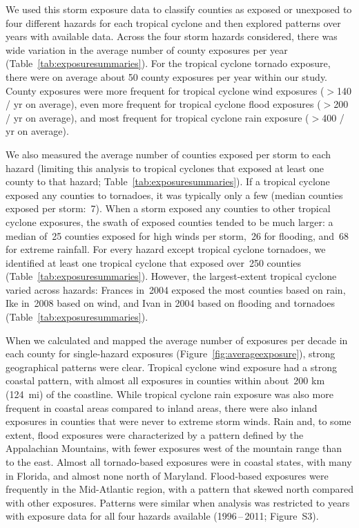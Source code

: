 We used this storm exposure data to classify counties as exposed or unexposed
to four different hazards for each tropical cyclone and then explored patterns
over years with available data. Across the four storm hazards considered, there
was wide variation in the average number of county exposures per year
(Table~\ref{tab:exposuresummaries}). For the tropical cyclone tornado exposure,
there were on average about 50 county exposures per year within our study.
County exposures were more frequent for tropical cyclone wind exposures ($>$140
/ yr on average), even more frequent for tropical cyclone flood exposures
($>$200 / yr on average), and most frequent for tropical cyclone rain exposure
($>$400 / yr on average). 

We also measured the average number of counties exposed per storm to each
hazard (limiting this analysis to tropical cyclones that exposed at least one
county to that hazard; Table~\ref{tab:exposuresummaries}).  If a tropical
cyclone exposed any counties to tornadoes, it was typically only a few (median
counties exposed per storm:~7). When a storm exposed any counties to other
tropical cyclone exposures, the swath of exposed counties tended to be much
larger: a median of~25 counties exposed for high winds per storm,~26 for
flooding, and~68 for extreme rainfall.  For every hazard except tropical
cyclone tornadoes, we identified at least one tropical cyclone that exposed
over~250 counties (Table~\ref{tab:exposuresummaries}).  However, the
largest-extent tropical cyclone varied across hazards: Frances in~2004 exposed
the most counties based on rain, Ike in~2008 based on wind, and Ivan in 2004
based on flooding and tornadoes (Table~\ref{tab:exposuresummaries}).

When we calculated and mapped the average number of exposures per decade in
each county for single-hazard exposures (Figure~\ref{fig:averageexposure}),
strong geographical patterns were clear. Tropical cyclone wind exposure had a
strong coastal pattern, with almost all exposures in counties within about~200
\si{\kilo\metre} (124~mi) of the coastline. While tropical cyclone rain
exposure was also more frequent in coastal areas compared to inland areas,
there were also inland exposures in counties that were never to extreme storm
winds. Rain and, to some extent, flood exposures were characterized by a
pattern defined by the Appalachian Mountains, with fewer exposures west of the
mountain range than to the east. Almost all tornado-based exposures were in
coastal states, with many in Florida, and almost none north of Maryland.
Flood-based exposures were frequently in the Mid-Atlantic region, with a
pattern that skewed north compared with other exposures.  Patterns were similar
when analysis was restricted to years with exposure data for all four hazards
available (1996\,--\,2011; Figure~S3). 

